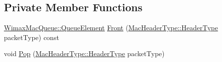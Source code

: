 \subsection*{Private Member Functions}
\begin{DoxyCompactItemize}
\item 
\hyperlink{structns3_1_1WimaxMacQueue_1_1QueueElement}{Wimax\+Mac\+Queue\+::\+Queue\+Element} \hyperlink{classns3_1_1WimaxMacQueue_ab02b8007b7f0090eccaf01a3d3dc0b98}{Front} (\hyperlink{classns3_1_1MacHeaderType_a54d8fc8bc93a2b7865627965cdd31c20}{Mac\+Header\+Type\+::\+Header\+Type} packet\+Type) const 
\item 
void \hyperlink{classns3_1_1WimaxMacQueue_a35f80569dacb6e4b01ecadc4f3fa7dd4}{Pop} (\hyperlink{classns3_1_1MacHeaderType_a54d8fc8bc93a2b7865627965cdd31c20}{Mac\+Header\+Type\+::\+Header\+Type} packet\+Type)
\end{DoxyCompactItemize}

